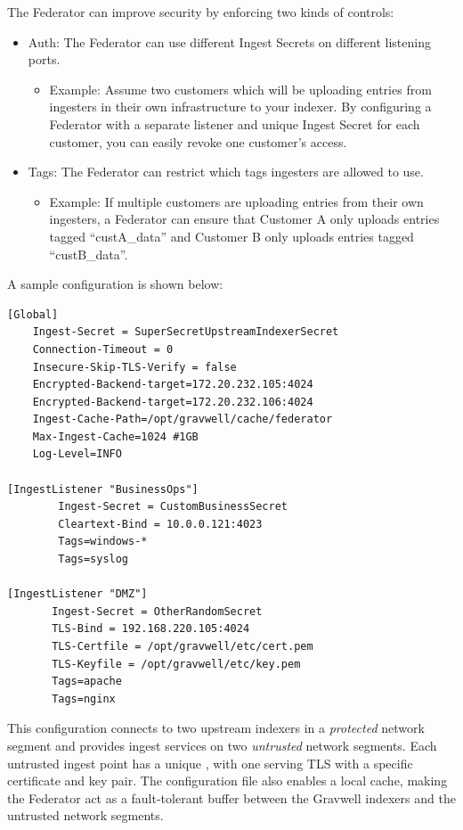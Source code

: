 The Federator can improve security by enforcing two kinds of controls:

\begin{itemize}
\item
  Auth: The Federator can use different Ingest Secrets on different
  listening ports. 
	\begin{itemize}
	\item Example: Assume two customers which will be uploading entries from ingesters in their own infrastructure to your indexer. By configuring a Federator with a separate listener and unique Ingest Secret for each customer, you can easily revoke one customer's access.
	\end{itemize}
\item
  Tags: The Federator can restrict which tags ingesters are allowed to
  use.
	\begin{itemize}
	\item Example: If multiple customers are uploading entries from their own ingesters, a Federator can ensure that Customer A only uploads entries tagged ``custA\_data'' and Customer B only uploads entries tagged ``custB\_data''.
	\end{itemize}
\end{itemize}

A sample configuration is shown below:

\begin{Verbatim}[breaklines=true]
[Global]
    Ingest-Secret = SuperSecretUpstreamIndexerSecret
    Connection-Timeout = 0
    Insecure-Skip-TLS-Verify = false
    Encrypted-Backend-target=172.20.232.105:4024
    Encrypted-Backend-target=172.20.232.106:4024
    Ingest-Cache-Path=/opt/gravwell/cache/federator
    Max-Ingest-Cache=1024 #1GB
    Log-Level=INFO

[IngestListener "BusinessOps"]
        Ingest-Secret = CustomBusinessSecret
        Cleartext-Bind = 10.0.0.121:4023
        Tags=windows-*
        Tags=syslog

[IngestListener "DMZ"]
       Ingest-Secret = OtherRandomSecret
       TLS-Bind = 192.168.220.105:4024
       TLS-Certfile = /opt/gravwell/etc/cert.pem
       TLS-Keyfile = /opt/gravwell/etc/key.pem
       Tags=apache
       Tags=nginx
\end{Verbatim}

This configuration connects to two upstream indexers in a
\emph{protected} network segment and provides ingest services on two
\emph{untrusted} network segments. Each untrusted ingest point has a unique
, with one serving TLS with a specific certificate and
key pair. The configuration file also enables a local cache, making the
Federator act as a fault-tolerant buffer between the Gravwell indexers
and the untrusted network segments.

